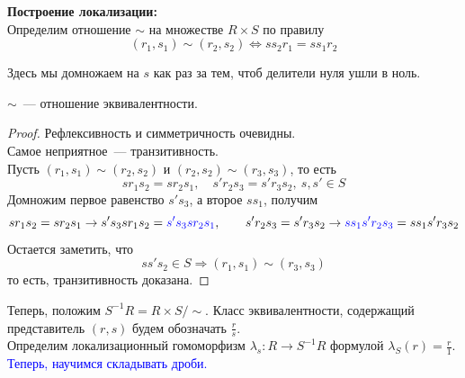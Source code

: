 \documentclass[11pt]{article}
\begin{document}
    \textbf{Построение локализации:}\\

    Определим отношение $\sim$ на множестве $R \times S$ по правилу
    \[ (r_1, s_1) \sim (r_2, s_2) \Longleftrightarrow s s_2 r_1 = s s_1 r_2 \]
    \begin{remark}
        Здесь мы домножаем на $s$ как раз за тем, чтоб делители нуля ушли в ноль.
    \end{remark}
    \begin{statement}
        $\sim$~--- отношение эквивалентности.
    \end{statement}
    \begin{proof}
        Рефлексивность и симметричность очевидны. \\
        Самое неприятное~--- транзитивность.\\
        Пусть $(r_1, s_1) \sim (r_2, s_2)$ и $(r_2, s_2) \sim (r_3, s_3)$, то есть
        \[ s r_1 s_2 = s r_2 s_1, \quad s' r_2 s_3 = s' r_3 s_2, \ s, s' \in S \]
        Домножим первое равенство $s' s_3$, а второе $s s_1$, получим
        \[ s r_1 s_2 = s r_2 s_1 \to s' s_3 s r_1 s_2 = \textcolor{blue}{s' s_3 s r_2 s_1}, \qquad s' r_2 s_3 = s' r_3 s_2 \to \textcolor{blue}{s s_1 s' r_2 s_3}  = s s_1 s' r_3 s_2 \]
        Остается заметить, что
        \[ s s' s_2 \in S \Rightarrow (r_1, s_1) \sim (r_3, s_3) \]
        то есть, транзитивность доказана.
    \end{proof}

    Теперь, положим $S^{-1}R = R \times S / \sim$. Класс эквивалентности, содержащий представитель $(r, s)$ будем обозначать
    $\frac{r}{s}$.\\
    Определим локализационный гомоморфизм $\lambda_s\colon R \to S^{-1}R$ формулой $\lambda_{S}(r) = \frac{r}{1}$.\\

    \textcolor{blue}{Теперь, научимся складывать дроби.}
\end{document}
